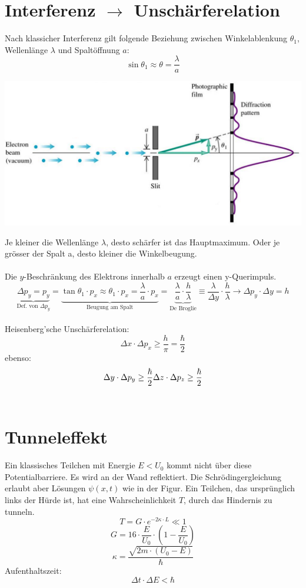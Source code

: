   \section{Interferenz $\rightarrow$ Unschärferelation}
  Nach klassicher Interferenz gilt folgende Beziehung zwischen Winkelablenkung $\theta_1$, Wellenlänge $\lambda$ und Spaltöffnung $a$:\
  \[
  		\sin\theta_1\approx \theta = \frac{\lambda}{a}
  \]
   \begin{center}
   	\includegraphics[scale = 0.2]{../fig/unschaerferelation.jpg}
   \end{center}
  Je kleiner die Wellenlänge $\lambda$, desto schärfer ist das Hauptmaximum. Oder je grösser der Spalt a, desto kleiner die Winkelbeugung.\\
  \\
  Die $y$-Beschränkung des Elektrons innerhalb $a$ erzeugt einen y-Querimpuls.
  \[
  		\underbrace{\Delta p_y=p_y}_{\text{Def. von $\Delta p_y$}}=
  		\underbrace{\tan\theta_1\cdot p_x \approx \theta_1\cdot p_x= \frac{\lambda}{a}\cdot p_x}_{\text{Beugung am Spalt}}=
  		\underbrace{\frac{\lambda}{a}\cdot\frac{h}{\lambda}}_{\text{De Broglie}}\equiv
  		\frac{\lambda}{\Delta y}\cdot\frac{h}{\lambda}
  		\rightarrow \Delta p_y\cdot\Delta y = h
  \]
\\
Heisenberg'sche Unschärferelation:
\[
	\Delta x \cdot \Delta p_x \geq \frac{h}{\pi}= \frac{\hbar}{2}	
\]
ebenso:
\[
	\Delta y \cdot \Delta p_y \geq \frac{\hbar}{2}	\\ \Delta z \cdot \Delta p_z \geq \frac{\hbar}{2} \\ \\
\]
\
\\
\section{Tunneleffekt}
Ein klassisches Teilchen mit Energie $E<U_0$ kommt nicht über diese Potentialbarriere. Es wird an der Wand reflektiert. Die Schrödingergleichung erlaubt aber Lösungen $\psi(x,t)$ wie in der Figur. Ein Teilchen, das ursprünglich links der Hürde ist, hat eine Wahrscheinlichkeit $T$, durch das Hindernis zu tunneln.\
\\
\[
	T=G\cdot e^{-2\kappa\cdot L}\ll 1
\]
\[
	G=16\cdot \frac{E}{U_0}\cdot \left( 1-\frac{E}{U_0}\right) 
\]
\[
	\kappa = \frac{\sqrt{2m\cdot\left( U_0-E  \right) }}{\hbar}
\]
Aufenthaltszeit:
\[
	\Delta t \cdot \Delta E < \hbar
\]
\
\\
